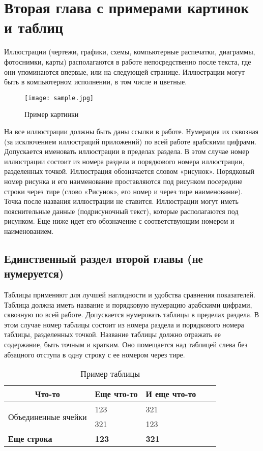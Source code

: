 \chapter{Вторая глава с примерами картинок и таблиц}

Иллюстрации (чертежи, графики, схемы, компьютерные распечатки, диаграммы, фотоснимки, карты) располагаются в работе непосредственно после текста, где они упоминаются впервые, или на следующей странице. Иллюстрации могут быть в компьютерном исполнении, в том числе и цветные.

\begin{figure}[htbp]
	\centering
	\texttt{[image: sample.jpg]}
	\caption{Пример картинки}
	\label{fig:figure-sample}
\end{figure}

На все иллюстрации должны быть даны ссылки в работе. Нумерация их сквозная (за исключением иллюстраций приложений) по всей работе арабскими цифрами. Допускается именовать иллюстрации в пределах раздела. В этом случае номер иллюстрации состоит из номера раздела и порядкового номера иллюстрации, разделенных точкой. Иллюстрация обозначается словом «рисунок». Порядковый номер рисунка и его наименование проставляются под рисунком посередине строки через тире (слово «Рисунок», его номер и через тире наименование). Точка после названия иллюстрации не ставится. Иллюстрации могут иметь пояснительные данные (подрисуночный текст), которые располагаются под рисунком. Еще ниже идет его обозначение с соответствующим номером и наименованием.

\section*{Единственный раздел второй главы (не нумеруется)}

Таблицы применяют для лучшей наглядности и удобства сравнения показателей. Таблица должна иметь название и порядковую нумерацию арабскими цифрами, сквозную по всей работе. Допускается нумеровать таблицы в пределах раздела. В этом случае номер таблицы состоит из номера раздела и порядкового номера таблицы, разделенных точкой. Название таблицы должно отражать ее содержание, быть точным и кратким. Оно помещается над таблицей слева без абзацного отступа в одну строку с ее номером через тире.

\begin{longtable}{|l|l|l|ll}
	\caption{Пример таблицы}
	\label{tab:table-sample}\\
	\cline{1-3}
	\multicolumn{1}{|c|}{Что-то} & \multicolumn{1}{c|}{Еще что-то} & \multicolumn{1}{c|}{И еще что-то} &  &  \\ \cline{1-3}
	\endhead
	\multirow{2}{*}{Объединенные ячейки} & 123          & 321          &  &  \\ \cline{2-3}
	& 321          & 123          &  &  \\ \cline{1-3}
	\textbf{Еще строка}                  & \textbf{123} & \textbf{321} &  &  \\ \cline{1-3}
\end{longtable}